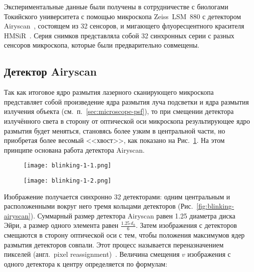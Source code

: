 Экспериментальные данные были получены в сотрудничестве с биологами Токийского университета с помощью микроскопа Zeiss~LSM~880 с детектором Airyscan~\cite{weisshart2014basic}, состоящем из 32 сенсоров, и мигающего флуоресцентного красителя HMSiR~\cite{uno2014spontaneously}. Серия снимков представляла собой 32 синхронных серии с разных сенсоров микроскопа, которые были предварительно совмещены.

\subsection{Детектор Airyscan}


Так как итоговое ядро размытия лазерного сканирующего микроскопа представляет собой произведение ядра размытия луча подсветки и ядра размытия излучения объекта (см.~п.~\ref{sec:microscope-psf}), то при смещении детектора излучённого света в сторону от оптической оси микроскопа результирующее ядро размытия будет меняться, становясь более узким в центральной части, но приобретая более весомый <<хвост>>, как показано на Рис.~\ref{fig:blinking-psf-displacement}. На этом принципе основана работа детектора Airyscan.

\begin{figure}[ht]
	\hfill
	\centering
	\begin{minipage}{0.45\textwidth}
		\centering
		\texttt{[image: blinking-1-1.png]}
		\label{fig:blinking-psf}
	\end{minipage} \hfill
	\begin{minipage}{0.45\textwidth}
		\centering
		\texttt{[image: blinking-1-2.png]}
		\label{fig:blinking-psf-displacement}
	\end{minipage}
	\hfill
\end{figure}

Изображение получается синхронно 32 детекторами: одним центральным и расположенными вокруг него тремя кольцами детекторов (Рис.~\ref{fig:blinking-airyscan}). Суммарный размер детектора Airyscan равен 1.25 диаметра диска Эйри, а размер одного элемента равен $\frac{1.25\ d_a}{6}$. Затем изображения с детекторов смещаются в сторону оптической оси с тем, чтобы положения максимумов ядер размытия детекторов совпали. Этот процесс называется переназначением пикселей (англ.~pixel reassignment)~\cite{sheppard2013superresolution}. Величина смещения $v$ изображения с одного детектора к центру определяется по формулам:

